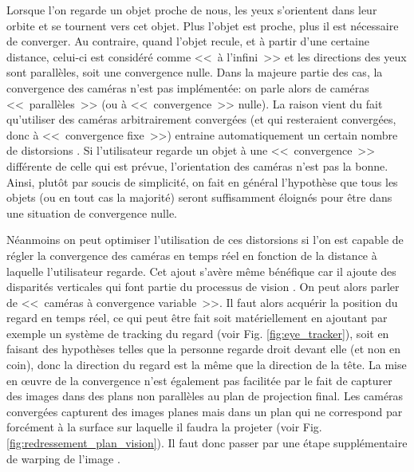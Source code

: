 	\par Lorsque l'on regarde un objet proche de nous, les yeux s'orientent dans leur orbite et se tournent vers cet objet. Plus l'objet est proche, plus il est nécessaire de converger. Au contraire, quand l'objet recule, et à partir d'une certaine distance, celui-ci est considéré comme <<~à l'infini~>> et les directions des yeux sont parallèles, soit une convergence nulle. Dans la majeure partie des cas, la convergence des caméras n'est pas implémentée: on parle alors de caméras <<~parallèles~>> (ou à <<~convergence~>> nulle). La raison vient du fait qu'utiliser des caméras arbitrairement convergées (et qui resteraient convergées, donc à <<~convergence fixe~>>) entraine automatiquement un certain nombre de distorsions \citep{woods_image_1993}. Si l'utilisateur regarde un objet à une <<~convergence~>> différente de celle qui est prévue, l'orientation des caméras n'est pas la bonne. Ainsi, plutôt par soucis de simplicité, on fait en général l'hypothèse que tous les objets (ou en tout cas la majorité) seront suffisamment éloignés pour être dans une situation de convergence nulle.
	
	\par Néanmoins on peut optimiser l'utilisation de ces distorsions si l'on est capable de régler la convergence des caméras en temps réel en fonction de la distance à laquelle l'utilisateur regarde. Cet ajout s'avère même bénéfique car il ajoute des disparités verticales qui font partie du processus de vision \citep{aurat_immersion_2016}. On peut alors parler de <<~caméras à convergence variable~>>. Il faut alors acquérir la position du regard en temps réel, ce qui peut être fait soit matériellement en ajoutant par exemple un système de tracking du regard (voir Fig. \ref{fig:eye_tracker}), soit en faisant des hypothèses telles que la personne regarde droit devant elle (et non en coin), donc la direction du regard est la même que la direction de la tête. La mise en œuvre de la convergence n'est également pas facilitée par le fait de capturer des images dans des plans non parallèles au plan de projection final. Les caméras convergées capturent des images planes mais dans un plan qui ne correspond par forcément à la surface sur laquelle il faudra la projeter (voir Fig. \ref{fig:redressement_plan_vision}). Il faut donc passer par une étape supplémentaire de warping de l'image \citep{aurat_immersion_2016}.
	
